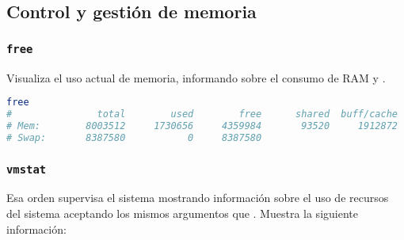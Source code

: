 \subsection{Control y gestión de memoria}

\subsubsection{\texttt{free}}

Visualiza el uso actual de memoria, informando sobre el consumo de RAM y .

\begin{lstlisting}[language=Bash]
free
#               total        used        free      shared  buff/cache   available
# Mem:        8003512     1730656     4359984       93520     1912872     5869584
# Swap:       8387580           0     8387580
\end{lstlisting}

\subsubsection{\texttt{vmstat}}

Esa orden supervisa el sistema mostrando información sobre el uso de recursos del sistema aceptando los mismos argumentos que .
Muestra la siguiente información:

